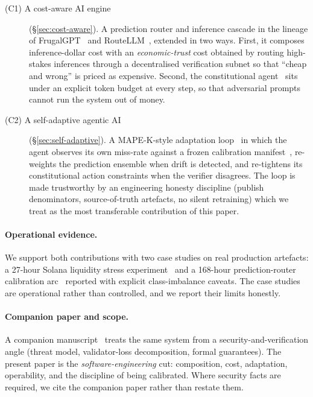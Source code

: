 \documentclass[11pt,a4paper]{article}
\begin{document}
\begin{description}
  \item[(C1) A cost-aware AI engine]
        (\S\ref{sec:cost-aware}). A prediction router and inference
        cascade in the lineage of FrugalGPT~\cite{chen2023frugalgpt} and
        RouteLLM~\cite{ong2024routellm}, extended in two ways. First, it
        composes inference-dollar cost with an \emph{economic-trust}
        cost obtained by routing high-stakes inferences through a
        decentralised verification subnet so that ``cheap and wrong''
        is priced as expensive. Second, the constitutional
        agent~\cite{bai2022constitutional} sits under an explicit token
        budget at every step, so that adversarial prompts cannot run the
        system out of money.
  \item[(C2) A self-adaptive agentic AI]
        (\S\ref{sec:self-adaptive}). A MAPE-K-style adaptation
        loop~\cite{salehie2009self,weyns2020introduction} in which the
        agent observes its own miss-rate against a frozen calibration
        manifest~\cite{omnirisk2026calibration,omnirisk2026predmetrics},
        re-weights the prediction ensemble when drift is detected, and
        re-tightens its constitutional action constraints when the
        verifier disagrees. The loop is made trustworthy by an
        engineering honesty discipline (publish denominators,
        source-of-truth artefacts, no silent retraining) which we treat
        as the most transferable contribution of this paper.
\end{description}

\paragraph{Operational evidence.}
We support both contributions with two case studies on real production
artefacts: a 27-hour Solana liquidity stress
experiment~\cite{omnirisk2026soak,omnirisk2026deploy} and a 168-hour
prediction-router calibration
arc~\cite{omnirisk2026predmetrics,omnirisk2026calibration} reported with
explicit class-imbalance caveats. The case studies are operational
rather than controlled, and we report their limits honestly.

\paragraph{Companion paper and scope.} A companion
manuscript~\cite{omnirisk2026defending} treats the same system from a
security-and-verification angle (threat model, validator-loss
decomposition, formal guarantees). The present paper is the
\emph{software-engineering} cut: composition, cost, adaptation,
operability, and the discipline of being calibrated. Where security
facts are required, we cite the companion paper rather than restate
them.
\end{document}
